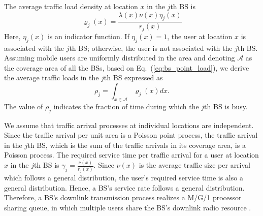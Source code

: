 \documentclass[journal]{IEEEtran}
\theoremstyle{definition}
\begin{document}
The average traffic load density at location $x$ in the $j$th BS is
\begin{equation}
\label{eq:bs_point_load}
\varrho_{j}(x)=\frac{\lambda(x)\nu(x)\eta_{j}(x)}{r_{j}(x)}
\end{equation}
Here, $\eta_{j}(x)$ is an indicator function. If $\eta_{j}(x)=1$, the user at location $x$ is associated with the $j$th BS; otherwise, the user is not associated with the $j$th BS.
Assuming mobile users are uniformly distributed in the area and denoting $\mathcal{A}$ as the coverage area of all the BSs, based on Eq.~(\ref{eq:bs_point_load}), we derive the average traffic loads in the $j$th BS expressed as
\begin{equation}
\label{eq:bs_load}
\rho_{j}=\int_{x \in \mathcal{A}}\varrho_{j}(x)dx.
\end{equation}
The value of $\rho_{j}$ indicates the fraction of time during which the $j$th BS is busy.

We assume that traffic arrival processes at individual locations are independent. Since the traffic arrival per unit area is a Poisson point process, the traffic arrival in the $j$th BS, which is the sum of the traffic arrivals in its coverage area, is a Poisson process. The required service time per traffic arrival for a user at location $x$ in the $j$th BS is $\gamma_{j}= \frac{\nu(x)}{r_{j}(x)}$.
Since $\nu(x)$ is the average traffic size per arrival which follows a general distribution, the user's required service time is also a general distribution. Hence, a BS's service rate follows a general distribution. Therefore, a BS's downlink transmission process realizes a M/G/1 processor sharing queue, in which multiple users share the BS's downlink radio resource \cite{Kleinrock:1976:QS}.
\end{document}
